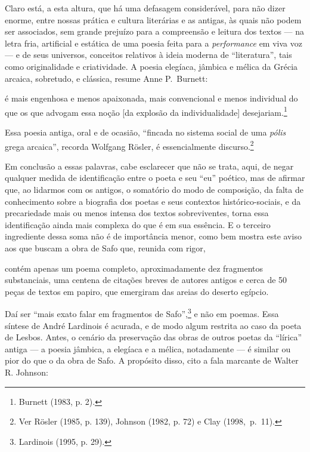 Claro está, a esta altura, que há uma defasagem considerável, para não dizer
enorme, entre nossas prática e cultura literárias e as antigas, às quais não
podem ser associados, sem grande prejuízo para a compreensão e leitura dos
textos --- na letra fria, artificial e estática de uma poesia feita para a
\textit{performance} em viva voz --- e de seus universos, conceitos relativos à
ideia moderna de “literatura”, tais como originalidade e criatividade. A poesia
elegíaca, jâmbica e mélica da Grécia arcaica, sobretudo, e clássica, resume
Anne P.~Burnett: 

\begin{hedraquote}
é mais engenhosa e menos apaixonada,
mais convencional e menos individual do que os que advogam essa noção [da
explosão da individualidade] desejariam.\footnote{ Burnett (1983, p. 2).} 
\end{hedraquote}

Essa poesia antiga, oral e de
ocasião, “fincada no sistema social de uma \textit{pólis} grega arcaica”,
recorda Wolfgang Rösler, é essencialmente discurso.\footnote{ Ver
Rösler (1985, p. 139), Johnson (1982, p. 72) e Clay \mbox{(1998, p. 11)}.}

Em conclusão a essas palavras, cabe esclarecer que não se trata, aqui, de negar
qualquer medida de identificação entre o poeta e seu “eu” poético, mas de
afirmar que, ao lidarmos com os antigos, o somatório do modo de composição, da
falta de conhecimento sobre a biografia dos poetas e seus contextos
histórico-sociais, e da precariedade mais ou menos intensa dos textos
sobreviventes, torna essa identificação ainda mais complexa do que é em sua
essência. E o terceiro ingrediente dessa soma não é de importância menor, como
bem mostra este aviso aos que buscam a obra de Safo que, reunida com rigor,

\begin{hedraquote}
contém apenas um poema completo, aproximadamente dez fragmentos substanciais,
uma centena de citações breves de autores antigos e cerca de 50 peças de textos
em papiro, que emergiram das areias do deserto egípcio.
\end{hedraquote}

Daí ser “mais exato
falar em fragmentos de Safo”,\footnote{ Lardinois (1995, p. 29).} e não em
poemas. Essa síntese de André Lardinois é acurada, e de modo algum restrita ao
caso da poeta de Lesbos.
Antes, o cenário da preservação das obras de outros poetas da “lírica” antiga ---
a poesia jâmbica, a elegíaca e a mélica, notadamente --- é similar ou pior do que
o da obra de Safo. A propósito disso, cito a fala marcante de Walter R. Johnson:

